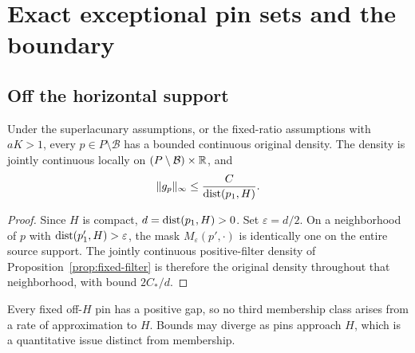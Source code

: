 \section{Exact exceptional pin sets and the boundary}\label{sec:pins}
\subsection{Off the horizontal support}
\begin{proposition}\label{prop:offH}
Under the superlacunary assumptions, or the fixed-ratio assumptions with
$aK>1$, every $p\in P\setminus\mathcal B$ has a bounded continuous
original density. The density is jointly continuous locally on
$(P\setminus\mathcal B)\times\mathbb R$, and
\begin{equation}\label{eq:off-H}
 \lVert g_p\rVert_\infty\leq\frac{C}{\operatorname{dist}(p_1,H)}.
\end{equation}
\end{proposition}
\begin{proof}
Since $H$ is compact, $d=\operatorname{dist}(p_1,H)>0$. Set $\varepsilon=d/2$.
On a neighborhood of $p$ with $\operatorname{dist}(p'_1,H)>\varepsilon$, the mask
$M_\varepsilon(p',\cdot)$ is identically one on the entire source
support. The jointly continuous positive-filter density of
Proposition~\ref{prop:fixed-filter} is therefore the original density
throughout that neighborhood, with bound $2C_*/d$.
\end{proof}
Every fixed off-$H$ pin has a positive gap, so no third membership class
arises from a rate of approximation to $H$. Bounds may diverge as pins
approach $H$, which is a quantitative issue distinct from membership.

